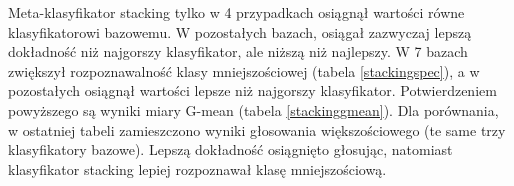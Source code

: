 Meta-klasyfikator stacking tylko w 4 przypadkach osiągnął wartości równe klasyfikatorowi bazowemu. W pozostałych bazach, osiągał zazwyczaj lepszą dokładność niż najgorszy klasyfikator, ale niższą niż najlepszy. W 7 bazach zwiększył rozpoznawalność klasy mniejszościowej (tabela \ref{stackingspec}), a w pozostałych osiągnął wartości lepsze niż najgorszy klasyfikator. Potwierdzeniem powyższego są wyniki miary G-mean (tabela \ref{stackinggmean}). Dla porównania, w ostatniej tabeli zamieszczono wyniki głosowania większościowego (te same trzy klasyfikatory bazowe). Lepszą dokładność osiągnięto głosując, natomiast klasyfikator stacking lepiej rozpoznawał klasę mniejszościową.


	\begin{table}[H]
		\tiny
		\begin{center}
\end{center}
\end{table}
